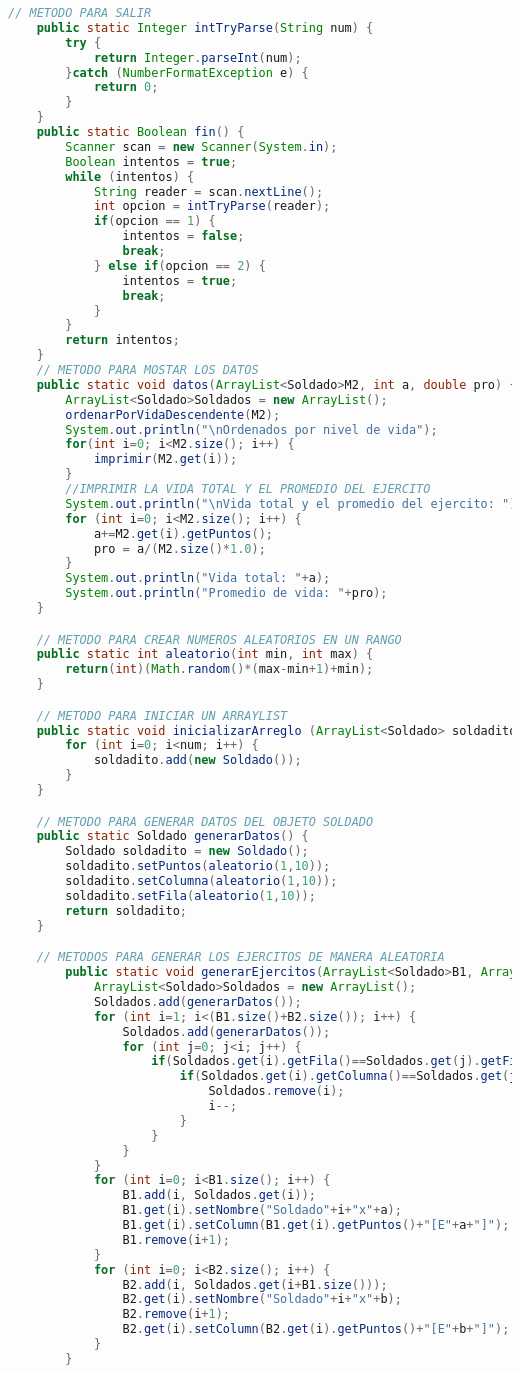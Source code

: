 \documentclass{article}
\begin{document}
\begin{itemize}
\begin{itemize}
\begin{lstlisting}[language=java]
	// METODO PARA SALIR
	public static Integer intTryParse(String num) {
		try {
			return Integer.parseInt(num);
		}catch (NumberFormatException e) {
			return 0;
		}
	}
	public static Boolean fin() {
		Scanner scan = new Scanner(System.in);
		Boolean intentos = true;
		while (intentos) {
			String reader = scan.nextLine();
			int opcion = intTryParse(reader);
			if(opcion == 1) {
				intentos = false;
				break;
			} else if(opcion == 2) {
				intentos = true;
				break;
			}
		}
		return intentos;
	}
	// METODO PARA MOSTAR LOS DATOS
	public static void datos(ArrayList<Soldado>M2, int a, double pro) {
		ArrayList<Soldado>Soldados = new ArrayList();
		ordenarPorVidaDescendente(M2);
		System.out.println("\nOrdenados por nivel de vida");
		for(int i=0; i<M2.size(); i++) {
			imprimir(M2.get(i));
		}
		//IMPRIMIR LA VIDA TOTAL Y EL PROMEDIO DEL EJERCITO
		System.out.println("\nVida total y el promedio del ejercito: ");
		for (int i=0; i<M2.size(); i++) {
			a+=M2.get(i).getPuntos();
			pro = a/(M2.size()*1.0);
		}
		System.out.println("Vida total: "+a);
		System.out.println("Promedio de vida: "+pro);
	}

	// METODO PARA CREAR NUMEROS ALEATORIOS EN UN RANGO
	public static int aleatorio(int min, int max) {
		return(int)(Math.random()*(max-min+1)+min);
	}

	// METODO PARA INICIAR UN ARRAYLIST
	public static void inicializarArreglo (ArrayList<Soldado> soldadito, int num) {
		for (int i=0; i<num; i++) {
			soldadito.add(new Soldado());
		}
	}

	// METODO PARA GENERAR DATOS DEL OBJETO SOLDADO
	public static Soldado generarDatos() {
		Soldado soldadito = new Soldado();
		soldadito.setPuntos(aleatorio(1,10));
		soldadito.setColumna(aleatorio(1,10));
		soldadito.setFila(aleatorio(1,10));
		return soldadito;
	}

	// METODOS PARA GENERAR LOS EJERCITOS DE MANERA ALEATORIA
		public static void generarEjercitos(ArrayList<Soldado>B1, ArrayList<Soldado>B2, int a, int b) {
			ArrayList<Soldado>Soldados = new ArrayList();
			Soldados.add(generarDatos());
			for (int i=1; i<(B1.size()+B2.size()); i++) {
				Soldados.add(generarDatos());
				for (int j=0; j<i; j++) {
					if(Soldados.get(i).getFila()==Soldados.get(j).getFila()) {
						if(Soldados.get(i).getColumna()==Soldados.get(j).getColumna()){
							Soldados.remove(i);
							i--;
						}
					}
				}
			}
			for (int i=0; i<B1.size(); i++) {
				B1.add(i, Soldados.get(i));
				B1.get(i).setNombre("Soldado"+i+"x"+a);
				B1.get(i).setColumn(B1.get(i).getPuntos()+"[E"+a+"]");
				B1.remove(i+1);
			}
			for (int i=0; i<B2.size(); i++) {
				B2.add(i, Soldados.get(i+B1.size()));
				B2.get(i).setNombre("Soldado"+i+"x"+b);
				B2.remove(i+1);
				B2.get(i).setColumn(B2.get(i).getPuntos()+"[E"+b+"]");
			}
		}



\end{lstlisting}
\end{itemize}
\end{itemize}
\end{document}
